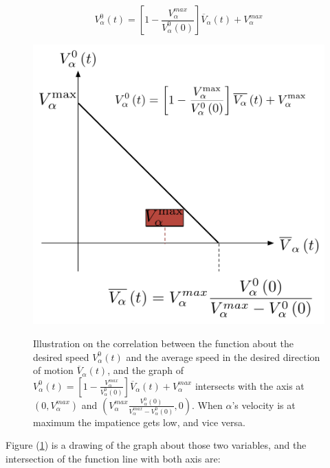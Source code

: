 \begin{itemize}
\begin{equation}\label{vv}
    V_{\alpha}^{0}(t) = \left[ 1 - \frac{V_{\alpha}^{max}}{V_{\alpha}^{0}(0)}\right]\overline{V}_{\alpha} \left( t \right) + V_{\alpha}^{max}
\end{equation}

\begin{figure}[ht]
\centering
{\includegraphics[scale=0.35]{Figures/impatience.pdf}} 
\caption[The impatience factor]{Illustration on the correlation between the function about the desired speed $ V_{\alpha}^{0}(t) $ 
and the average speed in the desired direction of motion $ \overline{V}_{\alpha} \left( t \right) $, and the graph of
$ V_{\alpha}^{0}(t) = \left[ 1 - \frac{V_{\alpha}^{max}}{V_{\alpha}^{0}(0)}\right]\overline{V}_{\alpha} \left( t \right) + V_{\alpha}^{max} $
intersects with the axis at $ \left( 0 , V_{\alpha}^{max} 
\right)  $ and $ \left(V_{\alpha}^{max} 
		\frac{V_{\alpha}^{0} \left( 0 \right) }{V_{\alpha}^{max}-V_{\alpha}^{0} \left(0 \right)} , 0 
\right)  $.
When $\alpha$'s velocity is at maximum the impatience gets low, and vice versa.}
\label{fig:impatience}
\end{figure}

Figure (\ref{fig:impatience}) is a drawing of the graph about those two variables, and the intersection
 of the function line with both axis are:


\end{itemize}
